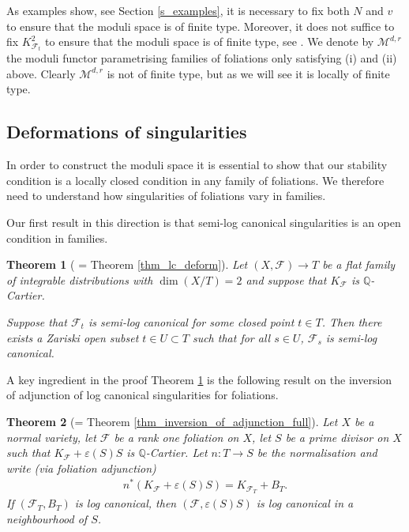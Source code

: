 \documentclass[12pt, a4paper]{amsart}
\newcounter{Theorem}
\newtheorem{theorem}{Theorem}[section]
\theoremstyle{definition}
\theoremstyle{named}
\begin{document}
As examples show, see Section \ref{s_examples}, it is necessary to fix both $N$ and $v$ to ensure that the moduli space is of finite type.  Moreover, it does not suffice to fix $K_{\mathcal F_t}^2$ 
to ensure that the moduli space is of finite type, see \cite[Example 4.1]{passantino2024}.
We denote by $\mathcal M^{d, r}$ the moduli functor parametrising families of foliations only satisfying (i) and (ii) above.  Clearly $\mathcal M^{d, r}$ is not of finite type, but as we will see it is locally of finite type.


\subsection{Deformations of singularities}
In order to construct the moduli space it is essential to show that our stability condition is a locally closed condition in any family of foliations.  We therefore need to understand how singularities of foliations vary in families.




Our first result in this direction is that semi-log canonical singularities is an open condition in families.

\begin{theorem}[ = Theorem \ref{thm_lc_deform}]
\label{thm_intro_lc_deform}
        Let $(X, \mathcal F) \rightarrow T$ be a flat
    family of integrable distributions with $\dim (X/T) = 2$ and suppose that $K_{\mathcal F}$
    is $\mathbb Q$-Cartier.

 Suppose that $\mathcal F_t$ is semi-log canonical for some closed point $t \in T$.  Then there exists a Zariski open subset $t \in U \subset T$ such that for all $s \in U$,
    $\mathcal F_{s}$ is semi-log canonical.    
\end{theorem}

A key ingredient in the proof Theorem \ref{thm_intro_lc_deform} is the following result on the inversion of adjunction of log canonical singularities for foliations. 

\begin{theorem}[= Theorem \ref{thm_inversion_of_adjunction_full}]
Let $X$ be a normal variety, let $\mathcal F$ be a rank one foliation on $X$, let $S$ be a prime divisor on $X$ such that $K_{\mathcal F}+\varepsilon(S)S$ is $\mathbb Q$-Cartier.
Let $n\colon T \rightarrow S$ be the normalisation and write (via foliation adjunction) \begin{align*}n^*(K_{\mathcal F}+\varepsilon(S)S) = K_{\mathcal F_T}+B_T.\end{align*} 
If $(\mathcal F_T, B_T)$ is log canonical, then 
$(\mathcal F, \varepsilon(S)S)$ is log canonical in a neighbourhood of $S$.
\end{theorem}
\end{document}

